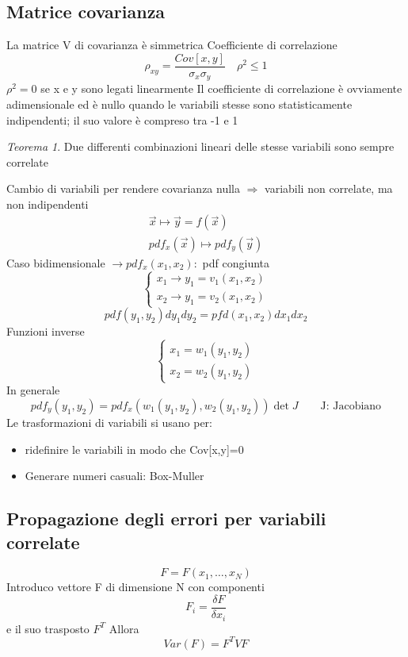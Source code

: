 \documentclass[12pt]{report}
\theoremstyle{remark}
\theoremstyle{theorem}
\newtheorem*{teo}{Teorema}
\begin{document}
\subsection{Matrice covarianza}
La matrice V di covarianza è simmetrica \newline
Coefficiente di correlazione 
\[\rho_{xy} = \frac{Cov[x,y]}{\sigma_x\sigma_y} \quad \rho^2 \le 1\]
$\rho^2 =0$ se x e y sono legati linearmente \newline
Il coefficiente di correlazione è ovviamente adimensionale ed è nullo quando le variabili stesse sono statisticamente indipendenti; il suo valore è compreso tra -1 e 1 
\begin{teo}
	Due differenti combinazioni lineari delle stesse variabili sono sempre correlate \newline
\end{teo}
\noindent Cambio di variabili per rendere covarianza nulla $\Rightarrow$ variabili non correlate, ma non indipendenti
\begin{gather*}
	\vec{x} \mapsto \vec{y} = f(\vec{x})\\
	pdf_x(\vec{x}) \mapsto pdf_y(\vec{y})
\end{gather*}
Caso bidimensionale $\rightarrow pdf_x(x_1,x_2):$ pdf congiunta
\[\begin{cases}
	x_1 \to y_1=v_1(x_1,x_2)\\
	x_2\to y_1=v_2(x_1,x_2)
\end{cases}\]
\[pdf(y_1,y_2)dy_1dy_2 = pfd(x_1,x_2)dx_1dx_2\]
Funzioni inverse
\[\begin{cases}
	x_1=w_1(y_1,y_2)\\
	x_2=w_2(y_1,y_2)
\end{cases}\]
In generale
\[pdf_y(y_1,y_2) = pdf_x(w_1(y_1,y_2),w_2(y_1,y_2))\det J \qquad \text{J: Jacobiano}\]
Le trasformazioni di variabili si usano per:
\begin{itemize}
	\item ridefinire le variabili in modo che Cov[x,y]=0
 \item Generare numeri casuali: Box-Muller
\end{itemize}
\subsection{Propagazione degli errori per variabili correlate}
\[F = F(x_1, \dots , x_N )\]
Introduco vettore F di dimensione N con componenti
\[F_i = \frac{\delta F}{\delta x_i}\]
e il suo trasposto $F^T$ \newline
Allora 
\[Var(F) = F^T V F\]
\end{document}
